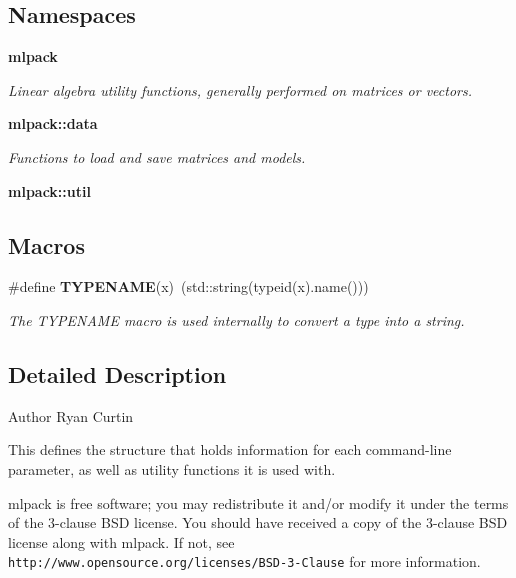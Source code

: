 \subsection*{Namespaces}
\begin{DoxyCompactItemize}
\item 
 \textbf{ mlpack}
\begin{DoxyCompactList}\small\item\em Linear algebra utility functions, generally performed on matrices or vectors. \end{DoxyCompactList}\item 
 \textbf{ mlpack\+::data}
\begin{DoxyCompactList}\small\item\em Functions to load and save matrices and models. \end{DoxyCompactList}\item 
 \textbf{ mlpack\+::util}
\end{DoxyCompactItemize}
\subsection*{Macros}
\begin{DoxyCompactItemize}
\item 
\#define \textbf{ T\+Y\+P\+E\+N\+A\+ME}(x)~(std\+::string(typeid(x).name()))
\begin{DoxyCompactList}\small\item\em The T\+Y\+P\+E\+N\+A\+ME macro is used internally to convert a type into a string. \end{DoxyCompactList}\end{DoxyCompactItemize}


\subsection{Detailed Description}
\begin{DoxyAuthor}{Author}
Ryan Curtin
\end{DoxyAuthor}
This defines the structure that holds information for each command-\/line parameter, as well as utility functions it is used with.

mlpack is free software; you may redistribute it and/or modify it under the terms of the 3-\/clause B\+SD license. You should have received a copy of the 3-\/clause B\+SD license along with mlpack. If not, see {\tt http\+://www.\+opensource.\+org/licenses/\+B\+S\+D-\/3-\/\+Clause} for more information. 

